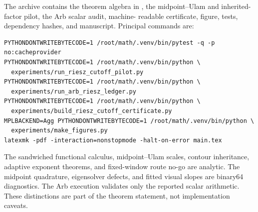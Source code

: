 \documentclass[11pt]{article}
\theoremstyle{remark}
\begin{document}
The archive contains the theorem algebra in , the
midpoint--Ulam and inherited-factor pilot, the Arb scalar audit, machine-
readable certificate, figure, tests, dependency hashes, and manuscript.
Principal commands are:
\begin{verbatim}
PYTHONDONTWRITEBYTECODE=1 /root/math/.venv/bin/pytest -q -p no:cacheprovider
PYTHONDONTWRITEBYTECODE=1 /root/math/.venv/bin/python \
  experiments/run_riesz_cutoff_pilot.py
PYTHONDONTWRITEBYTECODE=1 /root/math/.venv/bin/python \
  experiments/run_arb_riesz_ledger.py
PYTHONDONTWRITEBYTECODE=1 /root/math/.venv/bin/python \
  experiments/build_riesz_cutoff_certificate.py
MPLBACKEND=Agg PYTHONDONTWRITEBYTECODE=1 /root/math/.venv/bin/python \
  experiments/make_figures.py
latexmk -pdf -interaction=nonstopmode -halt-on-error main.tex
\end{verbatim}

The sandwiched functional calculus, midpoint--Ulam scales, contour
inheritance, adaptive exponent theorems, and fixed-window route no-go are
analytic.  The midpoint quadrature, eigensolver defects, and fitted visual
slopes are binary64 diagnostics.  The Arb execution validates only the
reported scalar arithmetic.  These distinctions are part of the theorem
statement, not implementation caveats.



\end{document}
